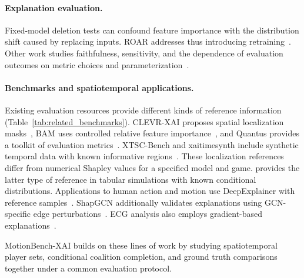 \paragraph{Explanation evaluation.} Fixed-model deletion tests can confound feature importance with the distribution shift caused by replacing inputs. ROAR addresses thus introducing retraining~\citep{hooker2019roar}. Other work studies faithfulness, sensitivity, and the dependence of evaluation outcomes on metric choices and parameterization~\citep{bhatt2020evaluating, hedstrom2023quantus}. %

\paragraph{Benchmarks and spatiotemporal applications.}
Existing evaluation resources provide different kinds of reference information (Table~\ref{tab:related_benchmarks}). CLEVR-XAI proposes spatial localization masks~\citep{arras2022clevr}, BAM uses controlled relative feature importance~\citep{Yang2019BenchmarkingAM}, and Quantus provides a toolkit of evaluation metrics~\citep{hedstrom2023quantus}.
XTSC-Bench and xaitimesynth include synthetic temporal data with known informative regions~\citep{hollig2023xtsc,baer2026xaitimesynth}. These localization references differ from numerical Shapley values for a
specified model and game. \citet{olsen2022using} provides the latter type of reference in tabular simulations with known conditional distributions. Applications to human action and motion use DeepExplainer with reference samples~\citep{auletta2023predicting,tempel2025choose}. ShapGCN additionally validates explanations using GCN-specific edge
perturbations~\citep{tempel2025explaining}. ECG analysis also employs gradient-based explanations~\citep{strodthoff2021ecg}.

MotionBench-XAI builds on these lines of work by studying spatiotemporal player sets, conditional coalition completion, and ground truth comparisons together under a common evaluation protocol. %




